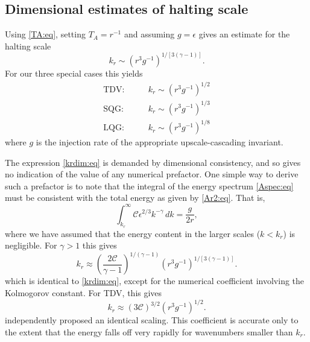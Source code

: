 \documentclass{jfm}
\newcommand{\ca}  [1]{\mathcal{#1}}
\begin{document}
\subsection{Dimensional estimates of halting scale}
\label{simpest:ssc}

Using \eqref{TA:eq}, setting $T_A = r^{-1}$ and assuming
$g=\epsilon$ gives an estimate for the halting scale
\begin{equation}
k_r \sim \left(r^3g^{-1}\right)^{{1 / [3(\gamma-1)]}}.
\label{krdim:eq}
\end{equation}
For our three special cases this yields
\begin{subequations}
\begin{align}
\textrm{TDV:} \qquad &k_r \sim \left(r^3g^{-1}\right)^{1/2} \\
\textrm{SQG:} \qquad &k_r \sim \left(r^3g^{-1}\right)^{1/3} \\
\textrm{LQG:} \qquad &k_r \sim \left(r^3g^{-1}\right)^{1/8}
\end{align}
\end{subequations}
where $g$ is the injection rate of the appropriate upscale-cascading
invariant.

The expression \eqref{krdim:eq} is demanded by dimensional
consistency, and so gives no indication of the value of any numerical
prefactor.  One simple way to derive such a prefactor is to note that
the integral of the energy spectrum \eqref{Aspec:eq} must be
consistent with the total energy as given by \eqref{Ar2:eq}. That is,
\begin{equation}
\int_{k_r}^\infty \ca{C}\epsilon^{2/3}k^{-\gamma} \, dk = \frac{g}{2r},
\label{krint:eq}
\end{equation}
where we have assumed that the energy content in the larger scales
($k<k_r$) is negligible.  For $\gamma > 1 $ this gives
\begin{equation}
k_r \approx \left(\frac{2\ca{C}}{\gamma-1} \right)^{1/(\gamma-1)}
\left(r^3g^{-1}\right)^{{1 / [3(\gamma-1)]}}.
\label{krgen1:eq}
\end{equation}
which is identical to \eqref{krdim:eq}, except for the numerical
coefficient involving the Kolmogorov constant. For TDV, this gives
\begin{equation}
k_r \approx \left({3\ca{C}} \right)^{3/2}
\left(r^3g^{-1}\right)^{1/2}.
\label{krtdv1:eq}
\end{equation}
\citet{danilov01a} independently proposed an identical scaling.  This
coefficient is accurate only to the extent that the energy falls off
very rapidly for wavenumbers smaller than $k_r$.
\end{document}
